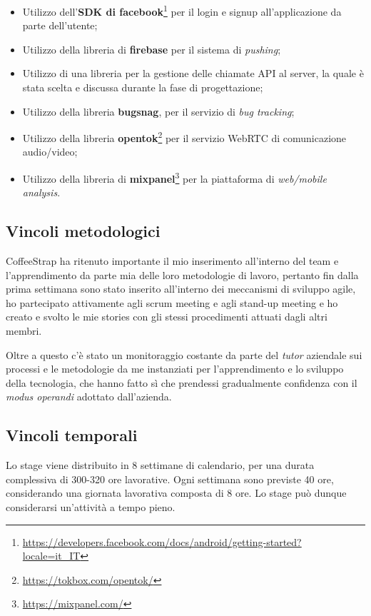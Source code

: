 \begin{itemize}

\item Utilizzo dell'\textbf{SDK di facebook}\footnote{\url{https://developers.facebook.com/docs/android/getting-started?locale=it_IT}} per il login e signup all'applicazione da parte dell'utente;
\item Utilizzo della libreria di \textbf{firebase} per il sistema di \textit{pushing};
\item Utilizzo di una libreria per la gestione delle chiamate API al server, la quale è stata scelta e discussa durante la fase di progettazione;
\item Utilizzo della libreria \textbf{bugsnag}, per il servizio di \textit{bug tracking};
\item Utilizzo della libreria \textbf{opentok}\footnote{\url{https://tokbox.com/opentok/}} per il servizio WebRTC di comunicazione audio/video;
\item Utilizzo della libreria di \textbf{mixpanel}\footnote{\url{https://mixpanel.com/}} per la piattaforma di \textit{web/mobile analysis}.

\end{itemize} 

\subsection{Vincoli metodologici}

CoffeeStrap ha ritenuto importante il mio inserimento all'interno del team e l'apprendimento da parte mia delle loro metodologie di lavoro, pertanto fin dalla prima settimana sono stato inserito all'interno dei meccanismi di sviluppo agile, ho partecipato attivamente agli scrum meeting e agli stand-up meeting e ho creato e svolto le mie stories con gli stessi procedimenti attuati dagli altri membri. 

Oltre a questo c'è stato un monitoraggio costante da parte del \textit{tutor} aziendale sui processi e le metodologie da me instanziati per l'apprendimento e lo sviluppo della tecnologia, che hanno fatto sì che prendessi gradualmente confidenza con il \textit{modus operandi} adottato dall'azienda.

\subsection{Vincoli temporali}

Lo stage viene distribuito in 8 settimane di calendario, per una durata complessiva di 300-320 ore lavorative. Ogni settimana sono previste 40 ore, considerando una giornata lavorativa composta di 8 ore. Lo stage può dunque considerarsi un'attività a tempo pieno.

